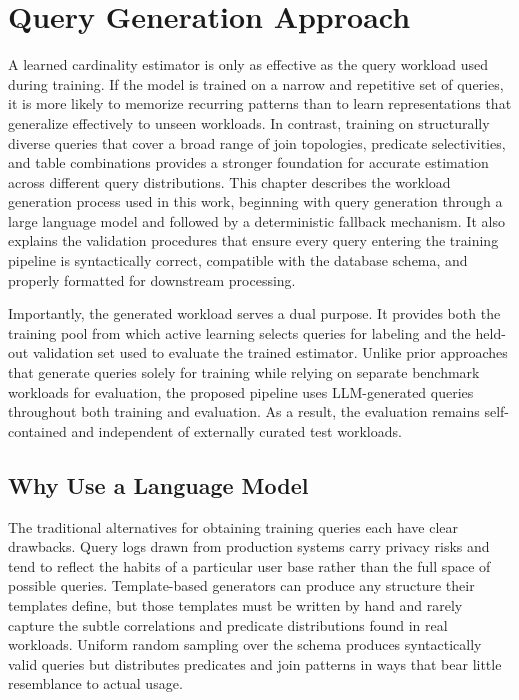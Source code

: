 \chapter{Query Generation Approach}
\label{chap:query_generation}
\pagestyle{plain}

A learned cardinality estimator is only as effective as the query workload used during training. If the model is trained on a narrow and repetitive set of queries, it is more likely to memorize recurring patterns than to learn representations that generalize effectively to unseen workloads. In contrast, training on structurally diverse queries that cover a broad range of join topologies, predicate selectivities, and table combinations provides a stronger foundation for accurate estimation across different query distributions. This chapter describes the workload generation process used in this work, beginning with query generation through a large language model and followed by a deterministic fallback mechanism. It also explains the validation procedures that ensure every query entering the training pipeline is syntactically correct, compatible with the database schema, and properly formatted for downstream processing.

Importantly, the generated workload serves a dual purpose. It provides both the training pool from which active learning selects queries for labeling and the held-out validation set used to evaluate the trained estimator. Unlike prior approaches that generate queries solely for training while relying on separate benchmark workloads for evaluation, the proposed pipeline uses LLM-generated queries throughout both training and evaluation. As a result, the evaluation remains self-contained and independent of externally curated test workloads.


\section{Why Use a Language Model}

The traditional alternatives for obtaining training queries each have clear drawbacks. Query logs drawn from production systems carry privacy risks and tend to reflect the habits of a particular user base rather than the full space of possible queries. Template-based generators can produce any structure their templates define, but those templates must be written by hand and rarely capture the subtle correlations and predicate distributions found in real workloads. Uniform random sampling over the schema produces syntactically valid queries but distributes predicates and join patterns in ways that bear little resemblance to actual usage.

